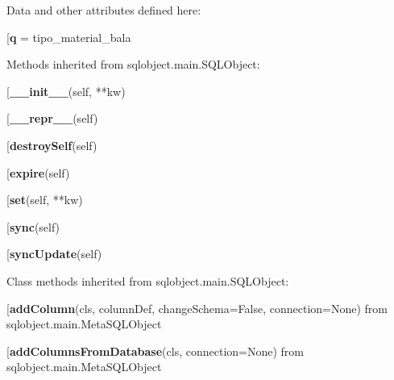 Data and other attributes defined here:\\
\begin{description}\item[{\bf q} = tipo\_material\_bala\end{description}


Methods inherited from sqlobject.main.SQLObject:\\
\begin{description}\item[{\bf \_\_init\_\_}(self, **kw)\end{description}

\begin{description}\item[{\bf \_\_repr\_\_}(self)\end{description}

\begin{description}\item[{\bf destroySelf}(self)\end{description}

\begin{description}\item[{\bf expire}(self)\end{description}

\begin{description}\item[{\bf set}(self, **kw)\end{description}

\begin{description}\item[{\bf sync}(self)\end{description}

\begin{description}\item[{\bf syncUpdate}(self)\end{description}


Class methods inherited from sqlobject.main.SQLObject:\\
\begin{description}\item[{\bf addColumn}(cls, columnDef, changeSchema=False, connection=None) from sqlobject.main.MetaSQLObject\end{description}

\begin{description}\item[{\bf addColumnsFromDatabase}(cls, connection=None) from sqlobject.main.MetaSQLObject\end{description}

